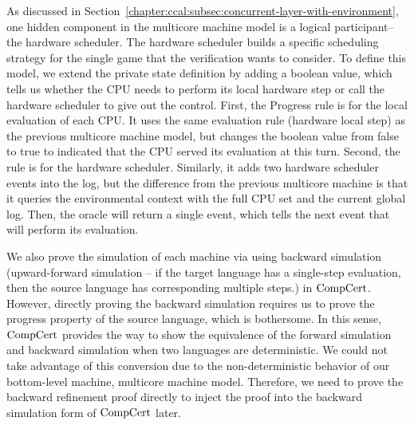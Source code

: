 As discussed in Section~\ref{chapter:ccal:subsec:concurrent-layer-with-environment}, 
one hidden component in the multicore machine model is a logical participant--the hardware scheduler. 
The hardware scheduler builds a specific scheduling strategy for the single game that the verification wants to consider.
To define this model, 
we extend the private state definition by adding a boolean value, which tells us whether the CPU needs to perform its local hardware step or call the hardware scheduler to give out the control. 
First, the \textsf{Progress} rule is for the local evaluation of each CPU. It uses the same evaluation rule (hardware local step) as the previous multicore machine model, 
but changes the boolean value from false to true to indicated that the CPU served its evaluation at this turn. 
Second, the  rule is for the hardware scheduler.
Similarly, it adds two hardware scheduler events into the log, but the difference from the previous multicore machine is that it queries the environmental context with the full CPU set and the current global log. 
Then, the oracle will return a single event, which tells the next event that will perform its evaluation. 

We also prove the simulation of each machine via using backward simulation (upward-forward simulation -- if the target language
has a single-step evaluation, then the source language has corresponding multiple steps.) 
in $\mathrm{CompCert}$. 
However, directly proving the backward simulation requires us to prove the progress property of the source language, which is bothersome. 
In this sense, $\mathrm{CompCert}$ provides the way to show the equivalence of the forward simulation and  backward simulation when 
two languages are deterministic.
We could not take advantage of this conversion due to the non-deterministic behavior of our bottom-level machine,
multicore machine model. 
Therefore, we  need to prove the backward refinement proof directly to inject the proof into the backward simulation form of $\mathrm{CompCert}$ later. 


